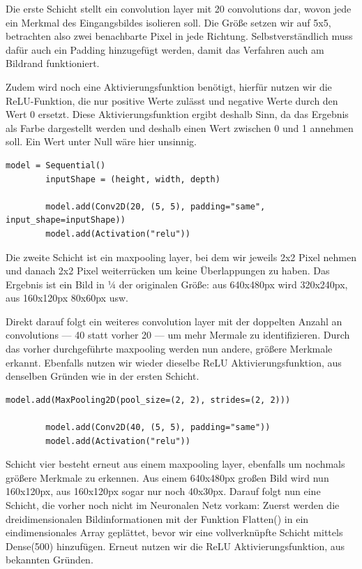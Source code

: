 \documentclass[conference]{IEEEtran}
\begin{document}
	Die erste Schicht stellt ein convolution layer mit 20 convolutions dar, wovon jede ein Merkmal des Eingangsbildes isolieren soll.
	Die Größe setzen wir auf 5x5, betrachten also zwei benachbarte Pixel in jede Richtung.
	Selbstverständlich muss dafür auch ein Padding hinzugefügt werden, damit das Verfahren auch am Bildrand funktioniert. 

	Zudem wird noch eine Aktivierungsfunktion benötigt, hierfür nutzen wir die ReLU-Funktion, die nur positive Werte zulässt und negative Werte durch den Wert 0 ersetzt.
	Diese Aktivierungsfunktion ergibt deshalb Sinn, da das Ergebnis als Farbe dargestellt werden und deshalb einen Wert zwischen 0 und 1 annehmen soll. Ein Wert unter Null wäre hier unsinnig.

	\begin{lstlisting}[label={list:model_1_1},caption=Sequentielles Modell und erste Schicht]
		model = Sequential()
		inputShape = (height, width, depth)

		model.add(Conv2D(20, (5, 5), padding="same", input_shape=inputShape))
		model.add(Activation("relu"))
	\end{lstlisting}

	Die zweite Schicht ist ein maxpooling layer, bei dem wir jeweils 2x2 Pixel nehmen und danach 2x2 Pixel weiterrücken um keine Überlappungen zu haben. Das Ergebnis ist ein Bild in ¼ der originalen Größe: aus 640x480px wird 320x240px, aus 160x120px 80x60px usw.

	Direkt darauf folgt ein weiteres convolution layer mit der doppelten Anzahl an convolutions — 40 statt vorher 20 — um mehr Mermale zu identifizieren.
	Durch das vorher durchgeführte maxpooling werden nun andere, größere Merkmale erkannt.
	Ebenfalls nutzen wir wieder dieselbe ReLU Aktivierungsfunktion, aus denselben Gründen wie in der ersten Schicht.

	\begin{lstlisting}[label={list:model_1_2},caption=Modell: zweite und dritte Schicht]
		model.add(MaxPooling2D(pool_size=(2, 2), strides=(2, 2)))

		model.add(Conv2D(40, (5, 5), padding="same"))
		model.add(Activation("relu"))
	\end{lstlisting}

	Schicht vier besteht erneut aus einem maxpooling layer, ebenfalls um nochmals größere Merkmale zu erkennen.
	Aus einem 640x480px großen Bild wird nun 160x120px, aus 160x120px sogar nur noch 40x30px.
	Darauf folgt nun eine Schicht, die vorher noch nicht im Neuronalen Netz vorkam:
	Zuerst werden die dreidimensionalen Bildinformationen mit der Funktion Flatten() in ein eindimensionales Array geplättet, bevor wir eine vollverknüpfte Schicht mittels Dense(500) hinzufügen.
	Erneut nutzen wir die ReLU Aktivierungsfunktion, aus bekannten Gründen.
\end{document}
